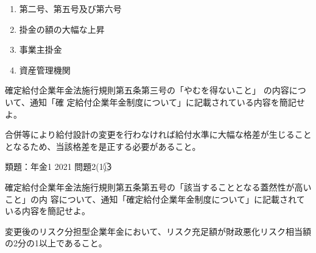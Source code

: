 \begin{answerbox}
  \begin{enumerate}[A:]
    \item 第二号、第五号及び第六号
    \item 掛金の額の大幅な上昇
    \item 事業主掛金
    \item 資産管理機関
  \end{enumerate}
\end{answerbox}

\begin{shortanswer}[数理人試験 \ 2019 \ 問題4 \ 設問2]
  確定給付企業年金法施行規則第五条第三号の「やむを得ないこと」 の内容について、通知「確
定給付企業年金制度について」に記載されている内容を簡記せよ。
\end{shortanswer}

\begin{answerbox}
  合併等により給付設計の変更を行わなければ給付水準に大幅な格差が生じることとなるため、当該格差を是正する必要があること。
\end{answerbox}

\begin{explanationbox}
  類題：年金1 2021 問題2(1)\textcircled{3}
\end{explanationbox}

\begin{shortanswer}[数理人試験 \ 2019 \ 問題4 \ 設問3]
  確定給付企業年金法施行規則第五条第五号の「該当することとなる蓋然性が高いこと」の内
容について、通知「確定給付企業年金制度について」に記載されている内容を簡記せよ。
\end{shortanswer}

\begin{answerbox}
  変更後のリスク分担型企業年金において、リスク充足額が財政悪化リスク相当額の2分の1以上であること。
\end{answerbox}



